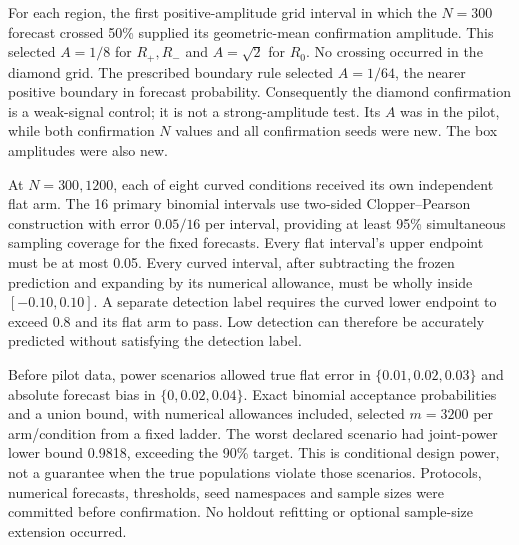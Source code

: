 \documentclass[11pt,a4paper]{article}
\begin{document}
For each region, the first positive-amplitude grid interval in which the
$N=300$ forecast crossed 50\% supplied its geometric-mean confirmation amplitude.
This selected $A=1/8$ for $R_+,R_-$ and $A=\sqrt2$ for $R_0$.
No crossing occurred in the diamond grid. The prescribed boundary rule
selected $A=1/64$, the nearer positive boundary in forecast probability.
Consequently the diamond confirmation is a weak-signal control; it is not a
strong-amplitude test. Its $A$ was in the pilot, while both confirmation $N$
values and all confirmation seeds were new. The box amplitudes were also new.

At $N=300,1200$, each of eight curved conditions received its own independent
flat arm. The 16 primary binomial intervals use two-sided Clopper--Pearson
construction with error $0.05/16$ per interval, providing at least 95\%
simultaneous sampling coverage for the fixed forecasts. Every flat interval's
upper endpoint must be at most 0.05. Every curved interval, after subtracting
the frozen prediction and expanding by its numerical allowance, must be wholly
inside $[-0.10,0.10]$. A separate detection label requires the curved lower
endpoint to exceed 0.8 and its flat arm to pass. Low detection can therefore
be accurately predicted without satisfying the detection label.

Before pilot data, power scenarios allowed true flat error in
$\{0.01,0.02,0.03\}$ and absolute forecast bias in $\{0,0.02,0.04\}$.
Exact binomial acceptance probabilities and a union bound, with numerical
allowances included, selected $m=3200$ per arm/condition from a fixed ladder.
The worst declared scenario had joint-power lower bound 0.9818, exceeding
the 90\% target. This is conditional design power, not a guarantee when the
true populations violate those scenarios. Protocols, numerical forecasts,
thresholds, seed namespaces and sample sizes were committed before confirmation.
No holdout refitting or optional sample-size extension occurred.
\end{document}
